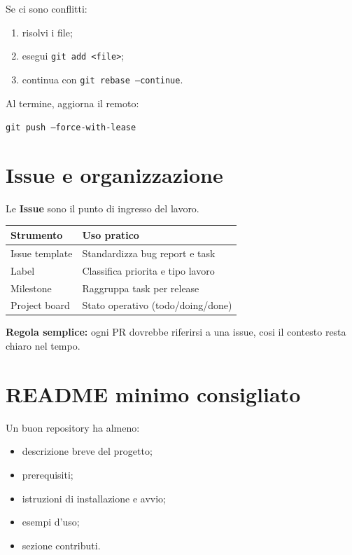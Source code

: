 \documentclass[a4paper,11pt]{article}
\begin{document}
Se ci sono conflitti:
\begin{enumerate}[leftmargin=1.2cm]
    \item risolvi i file;
    \item esegui \texttt{git add <file>};
    \item continua con \texttt{git rebase --continue}.
\end{enumerate}

Al termine, aggiorna il remoto:
\begin{codebox}
\texttt{git push --force-with-lease}
\end{codebox}

\section{Issue e organizzazione}
Le \textbf{Issue} sono il punto di ingresso del lavoro.

\begin{center}
\renewcommand{\arraystretch}{1.3}
\begin{tabularx}{\textwidth}{>{\ttfamily}l X}
\toprule
Strumento & Uso pratico \\
\midrule
Issue template & Standardizza bug report e task \\
Label & Classifica priorita e tipo lavoro \\
Milestone & Raggruppa task per release \\
Project board & Stato operativo (todo/doing/done) \\
\bottomrule
\end{tabularx}
\end{center}

\begin{infobox}
\textbf{Regola semplice:} ogni PR dovrebbe riferirsi a una issue, cosi il contesto resta chiaro nel tempo.
\end{infobox}

\section{README minimo consigliato}
Un buon repository ha almeno:
\begin{itemize}[leftmargin=1.2cm]
    \item descrizione breve del progetto;
    \item prerequisiti;
    \item istruzioni di installazione e avvio;
    \item esempi d'uso;
    \item sezione contributi.
\end{itemize}
\end{document}
